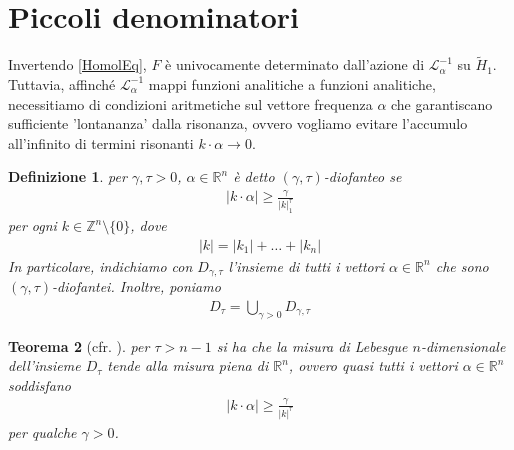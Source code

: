 \documentclass[twoside, 11pt]{amsbook}
\newcommand{\0}{{(0)}}
\newcommand{\3}{{(3)}}
\theoremstyle{colonplain}
\newtheorem{thm}{Teorema}[chapter]
\theoremstyle{colondefinition}
\newtheorem{defn}[thm]{Definizione}
\theoremstyle{colonremark}
\numberwithin{equation}{chapter}
\begin{document}
\section{Piccoli denominatori}
Invertendo \eqref{HomolEq}, $F$ è univocamente determinato dall'azione di $\mathcal{L}^{-1}_\alpha$ su $\tilde{H}_1$. Tuttavia, affinché $\mathcal{L}^{-1}_\alpha$ mappi funzioni analitiche a funzioni analitiche, necessitiamo di condizioni aritmetiche sul vettore frequenza $\alpha$ che garantiscano sufficiente 'lontananza' dalla risonanza, ovvero vogliamo evitare l'accumulo all'infinito di termini risonanti $k \cdot \alpha \rightarrow 0$.
\begin{defn} per $\gamma, \tau > 0$, $\alpha \in \mathbb{R}^n$ è detto $(\gamma, \tau)$-\textit{diofanteo} se 
\begin{align}
    |k \cdot \alpha| \geq \frac{\gamma}{|k|^\tau_1}
\end{align}
per ogni $k \in \mathbb{Z}^n \setminus \{0\}$, dove
\begin{align}
    |k| = |k_1| + \dots + |k_n|
\end{align}
In particolare, indichiamo con $D_{\gamma, \tau}$ l'insieme di tutti i vettori $\alpha \in \mathbb{R}^n$ che sono $(\gamma, \tau)$-diofantei. Inoltre, poniamo
\begin{align}\label{Diofant}
    D_\tau = \bigcup_{\gamma > 0}D_{\gamma, \tau}
\end{align}
\end{defn}
\begin{thm}[cfr. \cite{Poschel}] per $\tau > n - 1$ si ha che la misura di Lebesgue $n$-dimensionale dell'insieme $D_\tau$ tende alla misura piena di $\mathbb{R}^n$, ovvero quasi tutti i vettori $\alpha \in \mathbb{R}^n$ soddisfano
\begin{align}
    |k \cdot \alpha| \geq \frac{\gamma}{|k|^\tau}
\end{align}
per qualche $\gamma > 0$.
\end{thm}
\end{document}

